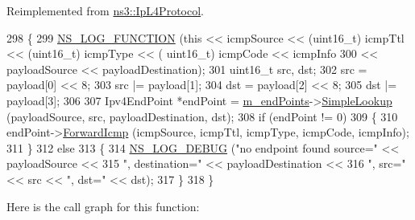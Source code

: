 Reimplemented from \hyperlink{classns3_1_1IpL4Protocol_a4859731c656d5309c07d2d47bacd4121}{ns3\+::\+Ip\+L4\+Protocol}.


\begin{DoxyCode}
298 \{
299   \hyperlink{log-macros-disabled_8h_a90b90d5bad1f39cb1b64923ea94c0761}{NS\_LOG\_FUNCTION} (\textcolor{keyword}{this} << icmpSource << (uint16\_t) icmpTtl << (uint16\_t) icmpType << (
      uint16\_t) icmpCode << icmpInfo
300                         << payloadSource << payloadDestination);
301   uint16\_t src, dst;
302   src = payload[0] << 8;
303   src |= payload[1];
304   dst = payload[2] << 8;
305   dst |= payload[3];
306 
307   Ipv4EndPoint *endPoint = \hyperlink{classns3_1_1TcpL4Protocol_a7ca53708bd7d91191af64a290095ebe7}{m\_endPoints}->\hyperlink{classns3_1_1Ipv4EndPointDemux_a524bb724e8bbd40648172938758860ec}{SimpleLookup} (payloadSource, src, 
      payloadDestination, dst);
308   \textcolor{keywordflow}{if} (endPoint != 0)
309     \{
310       endPoint->\hyperlink{classns3_1_1Ipv4EndPoint_a53cc03159a64a6aa2eed49382dc42381}{ForwardIcmp} (icmpSource, icmpTtl, icmpType, icmpCode, icmpInfo);
311     \}
312   \textcolor{keywordflow}{else}
313     \{
314       \hyperlink{group__logging_ga413f1886406d49f59a6a0a89b77b4d0a}{NS\_LOG\_DEBUG} (\textcolor{stringliteral}{"no endpoint found source="} << payloadSource <<
315                     \textcolor{stringliteral}{", destination="} << payloadDestination <<
316                     \textcolor{stringliteral}{", src="} << src << \textcolor{stringliteral}{", dst="} << dst);
317     \}
318 \}
\end{DoxyCode}


Here is the call graph for this function\+:


